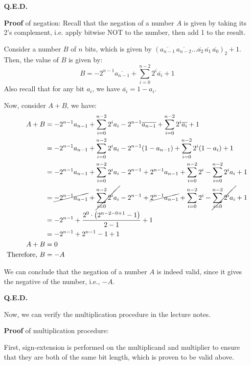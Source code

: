 \documentclass[answers]{exam}
\begin{document}
\begin{questions}
\begin{solution}
        \hfill \textbf{Q.E.D.}

        \textbf{Proof} of negation:
        Recall that the negation of a number $A$ is given by taking its 2's complement,
        i.e. apply bitwise NOT to the number, then add 1 to the result.

        Consider a number $B$ of $n$ bits, which is given by
        $\left(\overline{a_{n-1}}\,\overline{a_{n-2}} \dots \overline{a_2}\,\overline{a_1}\,\overline{a_0}\right)_2 + 1$.
        Then, the value of $B$ is given by:
        \[
            B = -2^{n-1}\overline{a_{n-1}} + \sum_{i=0}^{n-2} 2^i \overline{a_i} + 1
        \]
        Also recall that for any bit $a_i$, we have $\overline{a_i} = 1 - a_i$.

        Now, consider $A+B$, we have:
        \begin{align*}
            A+B &= -2^{n-1}a_{n-1} + \sum_{i=0}^{n-2} 2^i a_i -2^{n-1}\overline{a_{n-1}} + \sum_{i=0}^{n-2} 2^i \overline{a_i} + 1 \\
            &= -2^{n-1}a_{n-1} + \sum_{i=0}^{n-2} 2^i a_i -2^{n-1}(1-a_{n-1}) + \sum_{i=0}^{n-2} 2^i (1-a_i) + 1 \\
            &= -2^{n-1}a_{n-1} + \sum_{i=0}^{n-2} 2^i a_i -2^{n-1} + 2^{n-1} a_{n-1} + \sum_{i=0}^{n-2} 2^i - \sum_{i=0}^{n-2} 2^i a_i + 1 \\
            &= \cancel{-2^{n-1}a_{n-1}} + \cancel{\sum_{i=0}^{n-2} 2^i a_i} - 2^{n-1} + \cancel{2^{n-1} a_{n-1}} + \sum_{i=0}^{n-2} 2^i - \cancel{\sum_{i=0}^{n-2} 2^i a_i} + 1 \\
            &= -2^{n-1} + \frac{2^0\cdot\left(2^{n-2-0+1}-1\right)}{2-1} + 1 \\
            &= -2^{n-1} + 2^{n-1} - 1 + 1 \\
            A+B &= 0 \\
            \text{Therefore, } B &= -A
        \end{align*}

        We can conclude that the negation of a number $A$ is indeed valid,
        since it gives the negative of the number, i.e., $-A$.

        \hfill \textbf{Q.E.D.}

        Now, we can verify the multiplication procedure in the lecture notes.

        \textbf{Proof} of multiplication procedure:

        First, sign-extension is performed on the multiplicand and multiplier to ensure that they are both of the same bit length,
        which is proven to be valid above.


\end{solution}
\end{questions}
\end{document}
